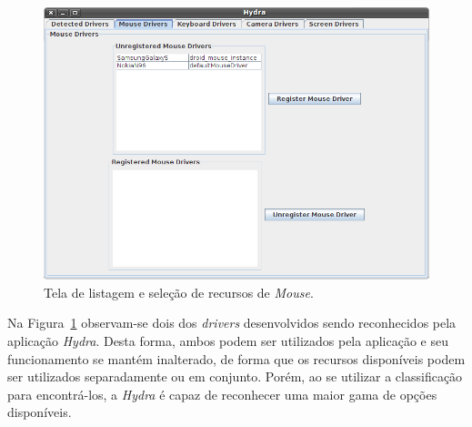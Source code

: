 \begin{figure}[ht]
	\center
	\includegraphics[scale=0.5]{imagens/printscreenMouseDrivers}
	\caption{Tela de listagem e seleção de recursos de \emph{Mouse}.}
	\label{fig:printscreen_hydra}
\end{figure}

Na Figura~\ref{fig:printscreen_hydra} observam-se dois dos \emph{drivers} desenvolvidos sendo reconhecidos pela aplicação \emph{Hydra}. Desta forma, ambos podem ser utilizados pela aplicação e seu funcionamento se mantém inalterado, de forma que os recursos disponíveis podem ser utilizados separadamente ou em conjunto. Porém, ao se utilizar a classificação para encontrá-los, a \emph{Hydra} é capaz de reconhecer uma maior gama de opções disponíveis.